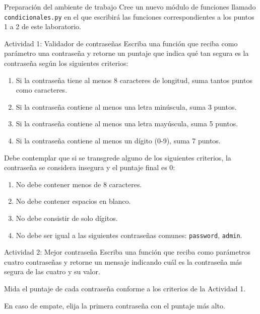 \documentclass{ip-lab}
\begin{document}
\maketitle

\begin{sectionbox}{Preparación del ambiente de trabajo}
  Cree un nuevo módulo de funciones llamado \texttt{condicionales.py} en el que escribirá las funciones correspondientes a los puntos 1 a 2 de este laboratorio.
\end{sectionbox}

\begin{sectionbox}{Actividad 1: Validador de contraseñas}
Escriba una función que reciba como parámetro una contraseña y retorne un puntaje que indica qué tan segura es la contraseña según los siguientes criterios:

\begin{enumerate}
    \item Si la contraseña tiene al menos 8 caracteres de longitud, suma tantos puntos como caracteres.
    \item Si la contraseña contiene al menos una letra minúscula, suma 3 puntos.
    \item Si la contraseña contiene al menos una letra mayúscula, suma 5 puntos.
    \item Si la contraseña contiene al menos un dígito (0-9), suma 7 puntos.
\end{enumerate}

Debe contemplar que si se transgrede alguno de los siguientes criterios, la contraseña se considera insegura y el puntaje final es 0:
\begin{enumerate}
    \item No debe contener menos de 8 caracteres.
    \item No debe contener espacios en blanco.
    \item No debe consistir de solo dígitos.
    \item No debe ser igual a las siguientes contraseñas comunes: \texttt{password}, \texttt{admin}.
\end{enumerate}
\end{sectionbox}

\begin{sectionbox}{Actividad 2: Mejor contraseña}
Escriba una función que reciba como parámetros cuatro contraseñas y retorne un mensaje indicando cuál es la contraseña más segura de las cuatro y su valor.

Mida el puntaje de cada contraseña conforme a los criterios de la Actividad 1. 

En caso de empate, elija la primera contraseña con el puntaje más alto.
\end{sectionbox}
\end{document}
